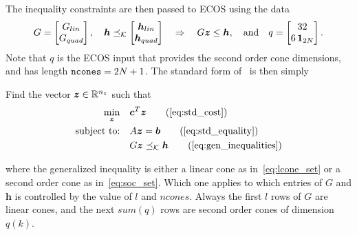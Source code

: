 \documentclass[10pt]{article}
\begin{document}
The inequality constraints are then passed to ECOS using the data
\begin{equation}
G = \begin{bmatrix}
G_{lin} \\ G_{quad}
\end{bmatrix}, \quad \bm{h} \preceq_{\mathcal{K}} \begin{bmatrix}
\bm{h}_{lin} \\ \bm{h}_{quad}
\end{bmatrix} \quad \Rightarrow \quad G \bm{z} \leq \bm{h}, \quad \text{and} \quad q = \begin{bmatrix}
32 \\ 6\,\bm{1}_{2N}
\end{bmatrix}.
\label{eq:gen_inequalities}
\end{equation}
Note that $q$ is the ECOS input that provides the second order cone dimensions, and has length $\texttt{ncones} = 2N+1$. The standard form of~ is then simply

\begin{problem}
Find the vector $\bm{z}\in{\mathbb{R}}^{n_z}$ such that
\begin{subequations}\label{eq:prob2}
\begin{align}
\min_{\bm{z}} &\quad \bm{c}^T \bm{z} \tag{\ref{eq:std_cost}}\\
\text{subject to:} &\quad A \bm{z} = \bm{b} \tag{\ref{eq:std_equality}} \\
&\quad G \bm{z} \preceq_{\mathcal{K}} \bm{h} \tag{\ref{eq:gen_inequalities}}
\end{align}
\end{subequations}
\end{problem}
where the generalized inequality is either a linear cone as in~\eqref{eq:lcone_set} or a second order cone as in~\eqref{eq:soc_set}. Which one applies to which entries of $G$ and $\bm{h}$ is controlled by the value of $l$ and $ncones$. Always the first $l$ rows of $G$ are linear cones, and the next $sum(q)$ rows are second order cones of dimension $q(k)$.




\end{document}

